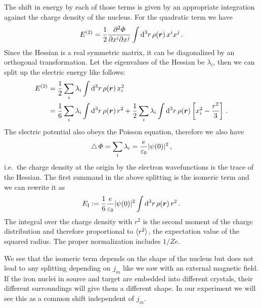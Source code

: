\documentclass[11pt, english, fleqn, DIV=15, headinclude, BCOR=2cm]{scrreprt}
\begin{document}
The shift in energy by each of those terms is given by an appropriate
integration against the charge density of the nucleus. For the quadratic term
we have
\[
    E^{(2)} = \frac 12 \frac{\partial^2 \Phi}{\partial x^i \partial x^j}
    \int \dif^3 r \, \rho(\vec r) \, x^i x^j \,.
\]
Since the Hessian is a real symmetric matrix, it can be diagonalized by an
orthogonal transformation. Let the eigenvalues of the Hessian be $\lambda_i$,
then we can split up the electric energy like follows:
\begin{align*}
    E^{(2)}
    &= \frac12 \sum_i \lambda_i \int \dif^3 r \, \rho(\vec r) \, x_i^2 \\
    &= \frac16 \sum_i \lambda_i \int \dif^3 r \, \rho(\vec r) \, r^2
    + \frac12 \sum_i \lambda_i \int \dif^3 r \, \rho(\vec r) \sbr{x_i^2 -
    \frac{r^2}3} \,.
\end{align*}
The electric potential also obeys the Poisson equation, therefore we also have
\[
    \operatorname{\bigtriangleup} \Phi = \sum_i \lambda_i = \frac{e}{\varepsilon_0} |\psi(0)|^2 \,,
\]
i.e.\ the charge density at the origin by the electron wavefunctions is the
trace of the Hessian. The first summand in the above splitting is the isomeric
term and we can rewrite it as
\[
    E_\text I := \frac16 \frac{e}{\varepsilon_0} |\psi(0)|^2
    \int \dif^3 r \, \rho(\vec r) \, r^2 \,.
\]
The integral over the charge density with $r^2$ is the second moment of the
charge distribution and therefore proportional to $\langle r^2 \rangle$, the
expectation value of the squared radius. The proper normalization includes
$1/Ze$.

We see that the isomeric term depends on the shape of the nucleus but does not
lead to any splitting depending on $j_m$ like we saw with an external magnetic
field. If the iron nuclei in source and target are embedded into different
crystals, their different surroundings will give them a different shape. In our
experiment we will see this as a common shift independent of $j_m$.

\parencite[33, 34]{Schatz/Nukleare_Festkoerperphysik}
\end{document}
